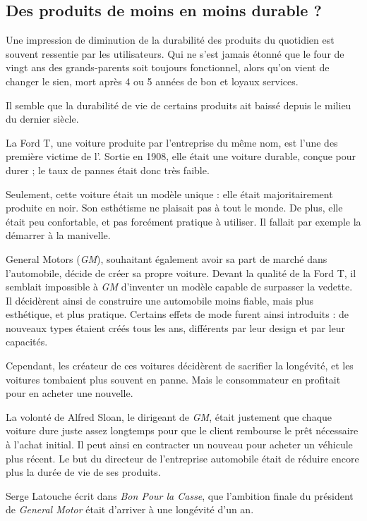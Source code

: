 \subsection{Des produits de moins en moins durable ?}

Une impression de diminution de la durabilité des produits du quotidien est souvent ressentie par les utilisateurs. Qui ne s'est jamais étonné que le four de vingt ans des grands-parents soit toujours fonctionnel, alors qu'on vient de changer le sien, mort après 4 ou 5 années de bon et loyaux services. 

Il semble que la durabilité de vie de certains produits ait baissé depuis le milieu du dernier siècle. 

\bigbreak
La Ford T, une voiture produite par l'entreprise du même nom, est l'une des première victime de l'\op. Sortie en 1908, elle était une voiture durable, conçue pour durer ; le taux de pannes était donc très faible.   


Seulement, cette voiture était un modèle unique : elle était majoritairement produite en noir. Son esthétisme ne plaisait pas à tout le monde. De plus, elle était peu confortable, et pas forcément pratique à utiliser. Il fallait par exemple la démarrer à la manivelle. 

\label{GM}
General Motors (\textit{GM}), souhaitant également avoir sa part de marché dans l'automobile, décide de créer sa propre voiture. Devant la qualité de la Ford T, il semblait impossible à \textit{GM} d'inventer un modèle capable de surpasser la vedette. Il décidèrent ainsi de construire une automobile moins fiable, mais plus esthétique, et plus pratique. Certains effets de mode furent ainsi introduits : de nouveaux types étaient créés tous les ans, différents par leur design et par leur capacités.


Cependant, les créateur de ces voitures décidèrent de sacrifier la longévité, et les voitures tombaient plus souvent en panne. Mais le consommateur en profitait pour en acheter une nouvelle.


La volonté de Alfred Sloan, le dirigeant de \textit{GM}, était justement que chaque voiture dure juste assez longtemps pour que le client rembourse le prêt nécessaire à l'achat initial.
Il peut ainsi en contracter un nouveau pour acheter un véhicule plus récent. Le but du directeur de l'entreprise automobile était de réduire encore plus la durée de vie de ses produits.

Serge Latouche écrit dans \textit{Bon Pour la Casse}\cite{bpc}, que l'ambition finale du président de \textit{General Motor} était d'arriver à une longévité d'un an.

